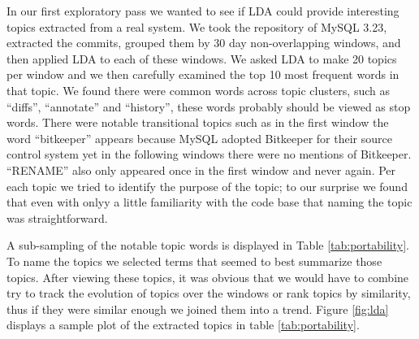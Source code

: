 \documentclass[times, 10pt,twocolumn]{article}
\begin{document}
In our first exploratory pass we wanted to see if LDA could provide
interesting topics extracted from a real system. We took the
repository of MySQL 3.23, extracted the commits, grouped them by 30
day non-overlapping windows, and then applied LDA to each of these
windows. We asked LDA to make 20 topics per window and we then
carefully examined the top 10 most frequent words in that topic.  We
found there were common words across topic clusters, such as
``diffs'', ``annotate'' and ``history'', these words probably should
be viewed as stop words. There were notable transitional topics such
as in the first window the word ``bitkeeper'' appears because MySQL
adopted Bitkeeper for their source control system yet in the following
windows there were no mentions of Bitkeeper. ``RENAME'' also only
appeared once in the first window and never again. Per each topic we
tried to identify the purpose of the topic; to our surprise we found
that even with onlyy a little familiarity with the code base that
naming the topic was straightforward.

A sub-sampling of the notable topic words is displayed in Table
\ref{tab:portability}.  To name the topics we selected terms that
seemed to best summarize those topics.  After viewing these topics, it was
obvious that we would have to combine try to track the evolution of
topics over the windows or rank topics by similarity, thus if they
were similar enough we joined them into a trend. Figure \ref{fig:lda}
displays a sample plot of the extracted topics in table
\ref{tab:portability}.


\end{document}
